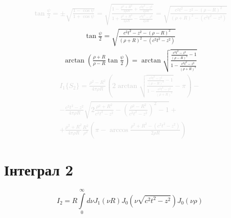 %
\textcolor{lightgray}{ \begin{equation*} \begin{aligned}
\tan \frac{\psi}{2} = \pm \sqrt{ \frac{1 - \cos \psi}{1 + \cos \psi} } = 
\sqrt{ \frac{1- \frac{\rho^2 + R^2}{2 \rho R} + \frac{c^2 t^2 - z^2}{2 \rho R}}
{1 + \frac{\rho^2 + R^2}{2 \rho R} - \frac{c^2 t^2 - z^2}{2 \rho R}} } =
\sqrt{ \frac{c^2t^2 - z^2 - \left( \rho - R \right)^2}
{\left( \rho + R \right)^2 - \left( c^2t^2 - z^2 \right)} }
\end{aligned} \end{equation*} }
%
\begin{equation*} \begin{aligned}
\tan \frac{\psi}{2} = 
\sqrt{ \frac{c^2t^2 - z^2 - \left( \rho - R \right)^2}
{\left( \rho + R \right)^2 - \left( c^2t^2 - z^2 \right)} }
\end{aligned} \end{equation*}
%
\begin{equation*} \begin{aligned}
\arctan \left( \frac{\rho + R}{\rho - R} \tan \frac{\psi}{2} \right) = 
\arctan \sqrt{ \frac{ \frac{c^2t^2 - z^2}{\left( \rho - R \right)^2} - 1}
{ 1 - \frac{c^2t^2 - z^2}{\left( \rho + R \right)^2} } }
\end{aligned} \end{equation*}
%
\textcolor{lightgray}{ \begin{equation*} \begin{aligned}
I_1 \{ S_2 \} = \frac{\rho^2 - R^2}{4 \pi \rho R} \left(
2 \arctan \sqrt{ \frac{ \frac{c^2t^2 - z^2}{\left( \rho - R \right)^2} - 1}
{ 1 - \frac{c^2t^2 - z^2}{\left( \rho + R \right)^2} } } - 
\pi \right) - \\ - \frac{c^2 t^2 - z^2}{4 \pi \rho R} 
\sqrt{2 \frac{\rho^2 + R^2 }{c^2 t^2 - z^2} - 
\left( \frac{\rho^2 - R^2 }{c^2 t^2 - z^2} \right)^2 - 1} + \\
+ \frac{\rho^2 + R^2}{4 \pi \rho R} \frac{R^2}{\rho^2} 
\left( \pi - \arccos \frac{\rho^2 + R^2 - (c^2 t^2 - z^2)}{2 \rho R} \right)
\end{aligned} \end{equation*} }

\section{Інтеграл 2}
%
\begin{equation} \label{eq:int2start}
I_2 = R \int \limits_{0}^{\infty} d \nu J_1 \left( \nu R \right)   
J_0 \left( \nu \sqrt{c^2t^2 - z^2} \right) J_0 \left( \nu \rho \right)
\end{equation}

